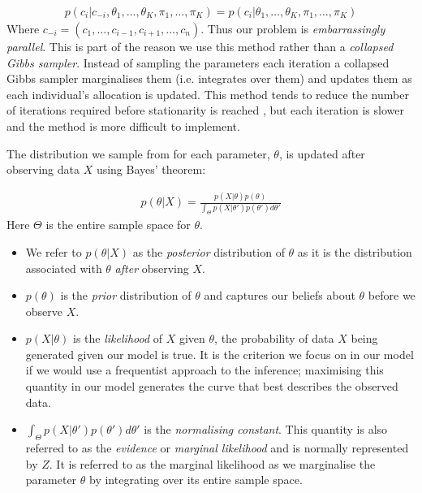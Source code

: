 \documentclass[11pt]{article} %
\begin{document}
\begin{align}
p(c_i|c_{-i}, \theta_1,\ldots,\theta_K, \pi_1,\ldots,\pi_K) = p(c_i| \theta_1,\ldots,\theta_K, \pi_1,\ldots,\pi_K)
\end{align}
Where $c_{-i} = (c_1, \ldots, c_{i-1}, c_{i+1}, \ldots, c_n)$. Thus our problem is \emph{embarrassingly parallel}. This is part of the reason we use this method rather than a \emph{collapsed Gibbs sampler}. Instead of sampling the parameters each iteration a collapsed Gibbs sampler marginalises them (i.e. integrates over them) and updates them as each individual's allocation is updated. This method tends to reduce the number of iterations required before stationarity is reached \cite{LiuCollapsedGibbsSampler1994}, but each iteration is slower and the method is more difficult to implement.

The distribution we sample from for each parameter, $\theta$, is updated after observing data $X$ using Bayes' theorem:

\begin{align} \label{Bayes_theorem}
p(\theta | X) = \frac{p(X | \theta) p(\theta)}{\int_\Theta p(X | \theta ') p(\theta ') d \theta '}
\end{align}
Here $\Theta$ is the entire sample space for $\theta$. 
\begin{itemize}
 \item We refer to $p(\theta | X)$ as the \emph{posterior} distribution of $\theta$ as it is the distribution associated with $\theta$ \emph{after} observing $X$.
 \item $p(\theta)$ is the \emph{prior} distribution of $\theta$ and captures our beliefs about $\theta$ before we observe $X$.
 \item $p(X | \theta)$ is the \emph{likelihood} of $X$ given $\theta$, the probability of data $X$ being generated given our model is true. It is the criterion we focus on in our model if we would use a frequentist approach to the inference; maximising this quantity in our model generates the curve that best describes the observed data. 
 \item $\int_\Theta p(X | \theta ') p(\theta ') d \theta '$ is the \emph{normalising constant}. This quantity is also referred to as the \emph{evidence} \cite{MacKayInformationTheoryInference2003} or \emph{marginal likelihood} and is normally represented by $Z$. It is referred to as the marginal likelihood as we marginalise the parameter $\theta$ by integrating over its entire sample space.
\end{itemize}
\end{document}
